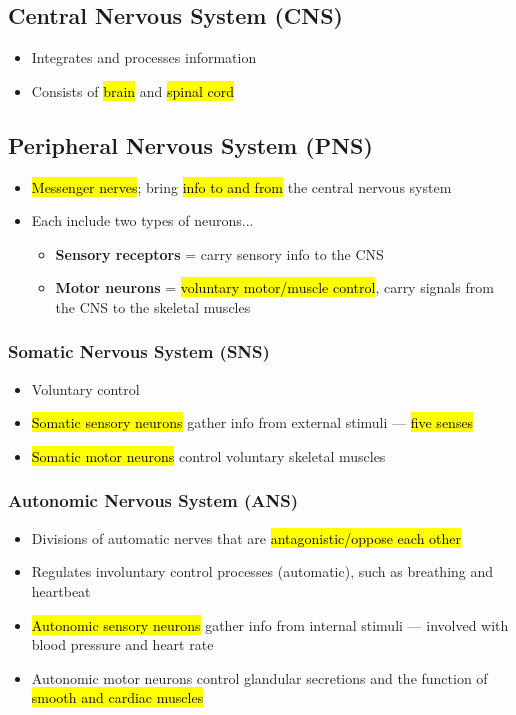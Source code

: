 \documentclass[a4paper,12pt]{article}
\begin{document}
\subsection{Central Nervous System (CNS)}
\begin{itemize}
    \item{Integrates and processes information}
    \item{Consists of \hl{brain} and \hl{spinal cord}}
\end{itemize}

\subsection{Peripheral Nervous System (PNS)}
\begin{itemize}
    \item{\hl{Messenger nerves}; bring \hl{info to and from} the central nervous system}
    \item{
            Each include two types of neurons...
            \begin{itemize}
                \item{\textbf{Sensory receptors} = carry sensory info to the CNS}
                \item{\textbf{Motor neurons} = \hl{voluntary motor/muscle control}, carry signals from the CNS to the skeletal muscles}
            \end{itemize}
        }

\end{itemize}

\subsubsection{Somatic Nervous System (SNS)}
\begin{itemize}
    \item{Voluntary control}
    \item{\hl{Somatic sensory neurons} gather info from external stimuli --- \hl{five senses}}
    \item{\hl{Somatic motor neurons} control voluntary skeletal muscles}
\end{itemize}

\subsubsection{Autonomic Nervous System (ANS)}
\begin{itemize}
    \item{Divisions of automatic nerves that are \hl{antagonistic/oppose each other}}
    \item{Regulates involuntary control processes (automatic), such as breathing and heartbeat}
    \item{\hl{Autonomic sensory neurons} gather info from internal stimuli --- involved with blood pressure and heart rate}
    \item{Autonomic motor neurons control glandular secretions and the function of \hl{smooth and cardiac muscles}}
\end{itemize}
\end{document}
